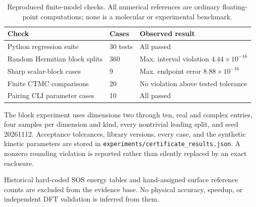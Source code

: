 \documentclass[11pt,a4paper]{article}
\theoremstyle{plain}
\theoremstyle{definition}
\theoremstyle{remark}
\providecommand{\path}[1]{\texttt{#1}}
\begin{document}
\begin{table}[ht]
\centering
\caption{Reproduced finite-model checks. All numerical references are ordinary
floating-point computations; none is a molecular or experimental benchmark.}
\begin{tabular}{lll}
\hline
Check & Cases & Observed result \\
\hline
Python regression suite & 30 tests & All passed \\
Random Hermitian block splits & 360 & Max. interval violation $4.44\times10^{-16}$ \\
Sharp scalar-block cases & 9 & Max. endpoint error $8.88\times10^{-16}$ \\
Finite CTMC comparisons & 20 & No violation above tested tolerance \\
Pairing CLI parameter cases & 10 & All passed \\
\hline
\end{tabular}
\label{tab:reproduced}
\end{table}
The block experiment uses dimensions two through ten, real and complex
entries, four samples per dimension and kind, every nontrivial leading
split, and seed 20261112. Acceptance tolerances, library versions, every
case, and the synthetic kinetic parameters are stored in
\path{experiments/certificate_results.json}. A nonzero rounding violation is
reported rather than silently replaced by an exact enclosure.

Historical hard-coded SOS energy tables and hand-assigned surface reference
counts are excluded from the evidence base. No physical accuracy, speedup, or
independent DFT validation is inferred from them.
\end{document}
